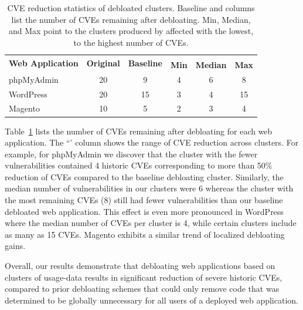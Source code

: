 \begin{table}[]
    \centering
    \caption{CVE reduction statistics of debloated clusters. Baseline and \dbltr{} columns list the number of CVEs remaining after debloating. Min, Median, and Max point to the clusters produced by \dbltr{} affected with the lowest, to the highest number of CVEs.}
    \label{tab:cve_reduction}
    \begin{tabular}{|l|c|c|ccc|}
    \hline
    \multirow{2}{*}{\textbf{Web Application}} & \multirow{2}{*}{\textbf{Original}} & \multirow{2}{*}{\textbf{Baseline}} & \multicolumn{3}{c|}{\textbf{\dbltr{}}}                        \\ \cline{4-6} 
                                     &                           &                            & \multicolumn{1}{c|}{\textbf{Min}} & \multicolumn{1}{c|}{\textbf{Median}} & \multicolumn{1}{c|}{\textbf{Max}} \\ \hline
    phpMyAdmin                       & 20                        & 9                          & \multicolumn{1}{c|}{4}   & \multicolumn{1}{c|}{6}      & 8   \\ \hline
    WordPress                        & 20                        & 15                         & \multicolumn{1}{c|}{3}   & \multicolumn{1}{c|}{4}      & 15  \\ \hline
    Magento                          & 10                        & 5                          & \multicolumn{1}{c|}{2}   & \multicolumn{1}{c|}{3}      & 4   \\ \hline
    \end{tabular}
\end{table}

Table~\ref{tab:cve_reduction} lists the number of CVEs remaining after debloating for each web application. 
The ``\dbltr{}' column shows the range of CVE reduction across clusters. 
For example, for phpMyAdmin we discover that the \dbltr{} cluster with the fewer vulnerabilities contained 4 historic CVEs corresponding to more than 50\% reduction of CVEs compared to the baseline debloating cluster. 
Similarly, the median number of vulnerabilities in our clusters were 6 whereas the cluster with the most remaining CVEs (8) still had fewer vulnerabilities than our baseline debloated web application. 
This effect is even more pronounced in WordPress where the median number of CVEs per cluster is 4, while certain clusters include as many as 15 CVEs. 
Magento exhibits a similar trend of localized debloating gains.

Overall, our results demonstrate that debloating web applications based on clusters of usage-data results in significant reduction of severe historic CVEs, compared to prior debloating schemes that could only remove code that was determined to be globally unnecessary for all users of a deployed web application.

